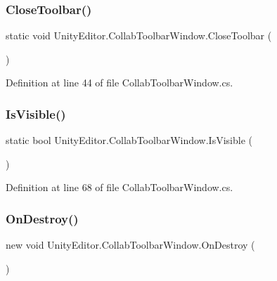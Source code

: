 \subsubsection{\texorpdfstring{CloseToolbar()}{CloseToolbar()}}
{\footnotesize\ttfamily static void Unity\+Editor.\+Collab\+Toolbar\+Window.\+Close\+Toolbar (\begin{DoxyParamCaption}{ }\end{DoxyParamCaption})\hspace{0.3cm}{\ttfamily [static]}}



Definition at line 44 of file Collab\+Toolbar\+Window.\+cs.

\mbox{\label{class_unity_editor_1_1_collab_toolbar_window_aed8304d575623b2234507f122ff950db}} 
\subsubsection{\texorpdfstring{IsVisible()}{IsVisible()}}
{\footnotesize\ttfamily static bool Unity\+Editor.\+Collab\+Toolbar\+Window.\+Is\+Visible (\begin{DoxyParamCaption}{ }\end{DoxyParamCaption})\hspace{0.3cm}{\ttfamily [static]}}



Definition at line 68 of file Collab\+Toolbar\+Window.\+cs.

\mbox{\label{class_unity_editor_1_1_collab_toolbar_window_ae83695cc4df5e99d568cc76a85113f6a}} 
\subsubsection{\texorpdfstring{OnDestroy()}{OnDestroy()}}
{\footnotesize\ttfamily new void Unity\+Editor.\+Collab\+Toolbar\+Window.\+On\+Destroy (\begin{DoxyParamCaption}{ }\end{DoxyParamCaption})}



